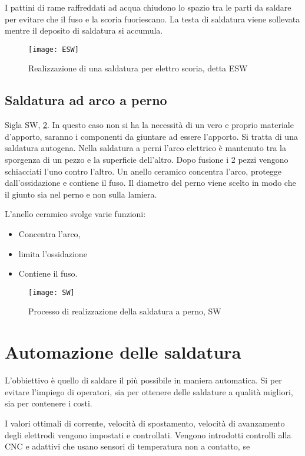 I pattini di rame raffreddati ad acqua chiudono lo spazio tra le parti da saldare per evitare che il fuso e la scoria fuoriescano.
La testa di saldatura viene sollevata mentre il deposito di saldatura si accumula.

\begin{figure}
\centering
\texttt{[image: ESW]}
\caption{Realizzazione di una saldatura per elettro scoria, detta \ac{ESW}}
\label{fig:ESW}
\end{figure}

\subsection{Saldatura ad arco a perno}
Sigla \ac{SW}, \ref{fig:SW}.
In questo caso non si ha la necessità di un vero e proprio materiale d'apporto, saranno i componenti da giuntare ad essere l'apporto.
Si tratta di una saldatura autogena.
Nella saldatura a perni l'arco elettrico è mantenuto tra la sporgenza di un pezzo e la superficie dell'altro.
Dopo fusione i 2 pezzi vengono schiacciati l'uno contro l'altro.
Un anello ceramico concentra l'arco, protegge dall'ossidazione e contiene il fuso.
Il diametro del perno viene scelto in modo che il giunto sia nel perno e non sulla lamiera.

L'anello ceramico svolge varie funzioni:
\begin{itemize}
\item Concentra l'arco,
\item limita l'ossidazione 
\item Contiene il fuso.
\end{itemize}

\begin{figure}
\centering
\texttt{[image: SW]}
\caption{Processo di realizzazione della saldatura a perno, \ac{SW}}
\label{fig:SW}
\end{figure}

\section{Automazione delle saldatura}
L'obbiettivo è quello di saldare il più possibile in maniera automatica.
Si per evitare l'impiego di operatori, sia per ottenere delle saldature a qualità migliori, sia per contenere i costi.

I valori ottimali di corrente, velocità di spostamento, velocità di avanzamento degli elettrodi vengono impostati e controllati.
Vengono introdotti controlli alla \ac{CNC} e adattivi che usano sensori di temperatura non a contatto, se

